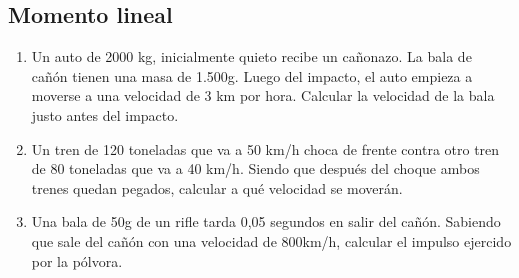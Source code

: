 \subsection*{Momento lineal}

\begin{enumerate}
    \item Un auto de 2000 kg, inicialmente quieto recibe un cañonazo. La bala de cañón tienen una masa de 1.500g. Luego del impacto, el auto empieza a moverse a una velocidad de 3 km por hora. Calcular la velocidad de la bala justo antes del impacto.

    \item Un tren de 120 toneladas que va a 50 km/h choca de frente contra otro tren de 80 toneladas que va a 40 km/h. Siendo que después del choque ambos trenes quedan pegados, calcular a qué velocidad se moverán.

    \item Una bala de 50g de un rifle tarda 0,05 segundos en salir del cañón. Sabiendo que sale del cañón con una velocidad de 800km/h, calcular el impulso ejercido por la pólvora.
\end{enumerate}
